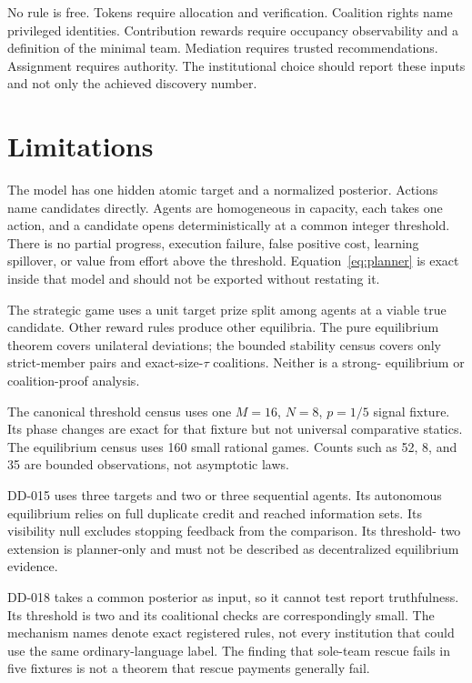 \documentclass[11pt]{article}
\begin{document}
No rule is free. Tokens require allocation and verification. Coalition rights
name privileged identities. Contribution rewards require occupancy
observability and a definition of the minimal team. Mediation requires trusted
recommendations. Assignment requires authority. The institutional choice
should report these inputs and not only the achieved discovery number.

\section{Limitations}

The model has one hidden atomic target and a normalized posterior. Actions name
candidates directly. Agents are homogeneous in capacity, each takes one action,
and a candidate opens deterministically at a common integer threshold. There is
no partial progress, execution failure, false positive cost, learning spillover,
or value from effort above the threshold. Equation~\ref{eq:planner} is exact
inside that model and should not be exported without restating it.

The strategic game uses a unit target prize split among agents at a viable true
candidate. Other reward rules produce other equilibria. The pure equilibrium
theorem covers unilateral deviations; the bounded stability census covers only
strict-member pairs and exact-size-$\tau$ coalitions. Neither is a strong-
equilibrium or coalition-proof analysis.

The canonical threshold census uses one $M=16$, $N=8$, $p=1/5$ signal fixture.
Its phase changes are exact for that fixture but not universal comparative
statics. The equilibrium census uses 160 small rational games. Counts such as
52, 8, and 35 are bounded observations, not asymptotic laws.

DD-015 uses three targets and two or three sequential agents. Its autonomous
equilibrium relies on full duplicate credit and reached information sets. Its
visibility null excludes stopping feedback from the comparison. Its threshold-
two extension is planner-only and must not be described as decentralized
equilibrium evidence.

DD-018 takes a common posterior as input, so it cannot test report truthfulness.
Its threshold is two and its coalitional checks are correspondingly small. The
mechanism names denote exact registered rules, not every institution that could
use the same ordinary-language label. The finding that sole-team rescue fails
in five fixtures is not a theorem that rescue payments generally fail.
\end{document}
